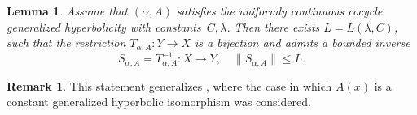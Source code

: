 \documentclass[12pt]{article}
\newtheorem{lem}[thm]{Lemma}
\theoremstyle{definition}
\newtheorem{remark}[thm]{Remark}
\begin{document}
\begin{lem}\label{lem:SS1}
Assume that $(\alpha, A)$ satisfies the uniformly continuous cocycle generalized hyperbolicity with constants~$C, \lambda$. Then there exists $L = L(\lambda, C)$, such that the restriction $T_{\alpha, A}: Y \to X$ is a bijection and admits a bounded inverse  
\begin{equation}\label{eq:Sf}
S_{\alpha, A} = T^{-1}_{\alpha, A}: X \to Y, \quad \|S_{\alpha, A}\| \leq L.
\end{equation}
\end{lem}
\begin{remark}
This statement generalizes \cite[Theorem 1, Step 1]{NilsonAli}, where the case in which $A(x)$ is a constant generalized hyperbolic isomorphism was considered.
\end{remark}
\end{document}
